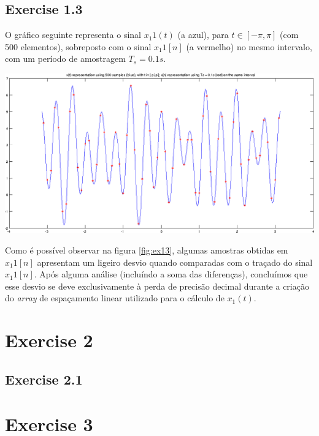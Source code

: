 \documentclass[a4paper]{article}
\begin{document}
\subsection{Exercise 1.3}
O gráfico seguinte representa o sinal $x_1{1}(t)$ (a azul), para $t \in [-\pi, \pi]$ (com 500 elementos), sobreposto com o sinal $x_1{1}[n]$ (a vermelho) no mesmo intervalo, com um período de amostragem $T_ {s} = 0.1s$.

\begin{center}
	\includegraphics[scale=0.45]{images/ex13.png}
	\label{fig:ex13}
\end{center}

\noindent Como é possível observar na figura \ref{fig:ex13}, algumas amostras obtidas em $x_1{1}[n]$ apresentam um ligeiro desvio quando comparadas com o traçado do sinal $x_1{1}[n]$. Após alguma análise (incluíndo a soma das diferenças), concluímos que esse desvio se deve exclusivamente à perda de precisão decimal durante a criação do \emph{array} de espaçamento linear utilizado para o cálculo de $x_{1}(t)$.


\section{Exercise 2}
\subsection{Exercise 2.1}
\indent \indent 



\section{Exercise 3}
\end{document}
